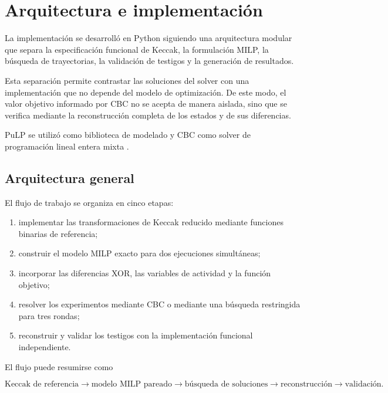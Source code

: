 \section{Arquitectura e implementación}
\label{sec:arquitectura_implementacion}

La implementación se desarrolló en Python siguiendo una arquitectura
modular que separa la especificación funcional de Keccak, la formulación
MILP, la búsqueda de trayectorias, la validación de testigos y la
generación de resultados.

Esta separación permite contrastar las soluciones del solver con una
implementación que no depende del modelo de optimización. De este modo,
el valor objetivo informado por CBC no se acepta de manera aislada, sino
que se verifica mediante la reconstrucción completa de los estados y de
sus diferencias.

PuLP se utilizó como biblioteca de modelado y CBC como solver de
programación lineal entera mixta
\cite{pulp_docs,cbc_guide}.


\subsection{Arquitectura general}
\label{subsec:arquitectura_general}

El flujo de trabajo se organiza en cinco etapas:

\begin{enumerate}
    \item implementar las transformaciones de Keccak reducido mediante
    funciones binarias de referencia;

    \item construir el modelo MILP exacto para dos ejecuciones simultáneas;

    \item incorporar las diferencias XOR, las variables de actividad y la
    función objetivo;

    \item resolver los experimentos mediante CBC o mediante una búsqueda
    restringida para tres rondas;

    \item reconstruir y validar los testigos con la implementación
    funcional independiente.
\end{enumerate}

El flujo puede resumirse como

\[
\text{Keccak de referencia}
\longrightarrow
\text{modelo MILP pareado}
\longrightarrow
\text{búsqueda de soluciones}
\longrightarrow
\text{reconstrucción}
\longrightarrow
\text{validación}.
\]

